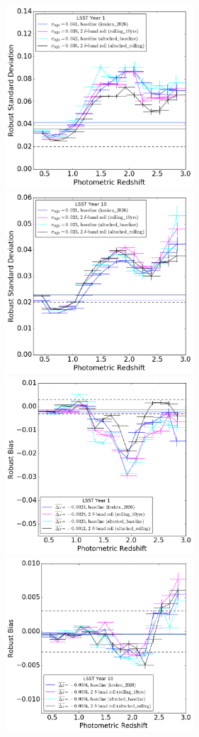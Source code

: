 \begin{figure}
\begin{center}
\includegraphics[width=7cm,trim={0cm 0cm 0cm 0cm},clip]{figures/ALTyear1_IQRs.png}
\includegraphics[width=7cm,trim={0cm 0cm 0cm 0cm},clip]{figures/ALTyear10_IQRs.png}
\includegraphics[width=7cm,trim={0cm 0cm 0cm 0cm},clip]{figures/ALTyear1_bias.png}
\includegraphics[width=7cm,trim={0cm 0cm 0cm 0cm},clip]{figures/ALTyear10_bias.png}

\end{center}
\end{figure}
